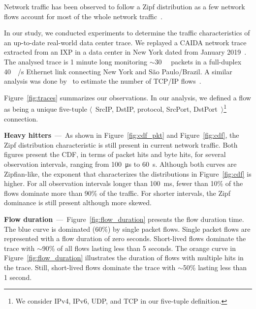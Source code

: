 Network traffic has been observed to follow a Zipf distribution as a few network flows account for most of the whole network traffic~\cite{Sarrar:2012,Jin:2017}.

In our study, we conducted experiments to determine the traffic characteristics of an up-to-date real-world data center trace.
We replayed a CAIDA network trace extracted from an IXP in a data center in New York dated from January 2019~\cite{caida:19}.
The analysed trace is 1 minute long monitoring $\sim$\SI{30}{\mega\nothing} packets in a full-duplex \SI{40}{\giga\bit/\second} Ethernet link connecting New York and S\~ao Paulo/Brazil.
A similar analysis was done by~\citeauthor{Spang:19} to estimate the number of TCP/IP flows~\cite{Spang:19}.

Figure~\ref{fig:traces} summarizes our observations.
In our analysis, we defined a flow as being a unique five-tuple $\langle$~SrcIP, DstIP, protocol, SrcPort, DstPort~$\rangle$\footnote{We consider IPv4, IPv6, UDP, and TCP in our five-tuple definition.} connection.

\textbf{Heavy hitters}~---~As shown in Figure~\ref{fig:cdf_pkt} and Figure~\ref{fig:cdf}, the Zipf distribution characteristic is still present in current network traffic.
Both figures present the CDF, in terms of packet hits and byte hits, for several observation intervals, ranging from \SI{100}{\micro\second} to \SI{60}{\second}.
Although both curves are Zipfian-like, the exponent that characterizes the distributions in Figure~\ref{fig:cdf} is higher.
For all observation intervals longer than \SI{100}{\milli\second}, fewer than 10\% of the flows dominate more than 90\% of the traffic.
For shorter intervals, the Zipf dominance is still present although more skewed.

\textbf{Flow duration}~---~Figure~\ref{fig:flow_duration} presents the flow duration time.
The blue curve is dominated (60\%) by single packet flows.
Single packet flows are represented with a flow duration of zero seconds.
Short-lived flows dominate the trace with $\sim$90\% of all flows lasting less than 5 seconds.
The orange curve in Figure~\ref{fig:flow_duration} illustrates the duration of flows with multiple hits in the trace.
Still, short-lived flows dominate the trace with $\sim$50\% lasting less than 1 second.%

